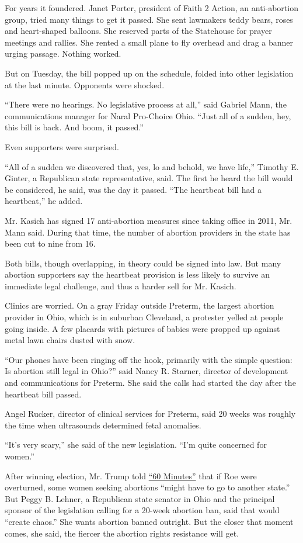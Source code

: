 For years it foundered. Janet Porter, president of Faith 2 Action, an
anti-abortion group, tried many things to get it passed. She sent
lawmakers teddy bears, roses and heart-shaped balloons. She reserved
parts of the Statehouse for prayer meetings and rallies. She rented a
small plane to fly overhead and drag a banner urging passage. Nothing
worked.

But on Tuesday, the bill popped up on the schedule, folded into other
legislation at the last minute. Opponents were shocked.

``There were no hearings. No legislative process at all,'' said Gabriel
Mann, the communications manager for Naral Pro-Choice Ohio. ``Just all
of a sudden, hey, this bill is back. And boom, it passed.''

Even supporters were surprised.

``All of a sudden we discovered that, yes, lo and behold, we have
life,'' Timothy E. Ginter, a Republican state representative, said. The
first he heard the bill would be considered, he said, was the day it
passed. ``The heartbeat bill had a heartbeat,'' he added.

Mr. Kasich has signed 17 anti-abortion measures since taking office in
2011, Mr. Mann said. During that time, the number of abortion providers
in the state has been cut to nine from 16.

Both bills, though overlapping, in theory could be signed into law. But
many abortion supporters say the heartbeat provision is less likely to
survive an immediate legal challenge, and thus a harder sell for Mr.
Kasich.

Clinics are worried. On a gray Friday outside Preterm, the largest
abortion provider in Ohio, which is in suburban Cleveland, a protester
yelled at people going inside. A few placards with pictures of babies
were propped up against metal lawn chairs dusted with snow.

``Our phones have been ringing off the hook, primarily with the simple
question: Is abortion still legal in Ohio?'' said Nancy R. Starner,
director of development and communications for Preterm. She said the
calls had started the day after the heartbeat bill passed.

Angel Rucker, director of clinical services for Preterm, said 20 weeks
was roughly the time when ultrasounds determined fetal anomalies.

``It's very scary,'' she said of the new legislation. ``I'm quite
concerned for women.''

After winning election, Mr. Trump told
\href{http://www.nytimes3xbfgragh.onion/2016/11/14/us/politics/donald-trump-twitter-white-house.html}{``60
Minutes''} that if Roe were overturned, some women seeking abortions
``might have to go to another state.'' But Peggy B. Lehner, a Republican
state senator in Ohio and the principal sponsor of the legislation
calling for a 20-week abortion ban, said that would ``create chaos.''
She wants abortion banned outright. But the closer that moment comes,
she said, the fiercer the abortion rights resistance will get.


